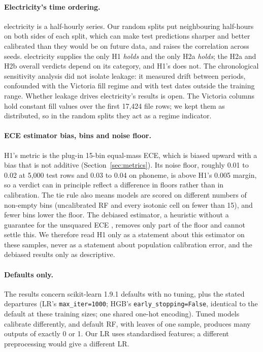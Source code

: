 \documentclass[11pt]{article}
\newcommand{\ds}[1]{\textsf{#1}}
\newcommand{\el}{\ds{electricity}}
\newcommand{\ph}{\ds{phoneme}}
\newcommand{\cat}[1]{\emph{#1}}
\begin{document}
\paragraph{Electricity's time ordering.} \el{} is a half-hourly series. Our random splits
put neighbouring half-hours on both sides of each split, which can make test predictions
sharper and better calibrated than they would be on future data, and raises the correlation
across seeds. \el{} supplies the only H1 \cat{holds} and the only H2a \cat{holds}; the H2a and
H2b overall verdicts depend on its category, and H1's does not. The chronological sensitivity
analysis did not isolate leakage: it measured drift between periods, confounded with the
Victoria fill regime and with test dates outside the training range. Whether leakage drives
\el's results is open. The Victoria columns hold constant fill values over the first 17,424
file rows; we kept them as distributed, so in the random splits they act as a regime
indicator.

\paragraph{ECE estimator bias, bins and noise floor.} H1's metric is the plug-in 15-bin
equal-mass ECE, which is biased upward with a bias that is not additive
(Section~\ref{sec:metrics}). Its noise floor, roughly 0.01 to 0.02 at 5,000 test rows and 0.03
to 0.04 on \ph, is above H1's 0.005 margin, so a verdict can in principle reflect a difference
in floors rather than in calibration. The tie rule also means models are scored on different
numbers of non-empty bins (uncalibrated RF and every isotonic cell on fewer than 15), and fewer
bins lower the floor. The debiased estimator, a heuristic without a guarantee for the
unsquared ECE \citep{kumar2019}, removes only part of the floor and cannot settle this. We
therefore read H1 only as a statement about this estimator on these samples, never as a
statement about population calibration error, and the debiased results only as descriptive.

\paragraph{Defaults only.} The results concern scikit-learn 1.9.1 defaults with no tuning,
plus the stated departures (LR's \texttt{max\_iter=1000}; HGB's \texttt{early\_stopping=False},
identical to the default at these training sizes; one shared one-hot encoding). Tuned models
calibrate differently, and default RF, with leaves of one sample, produces many outputs of
exactly 0 or 1. Our LR uses standardised features; a different preprocessing would give a
different LR.
\end{document}
